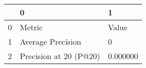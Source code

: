 \begin{tabular}{lll}
\toprule
 & 0 & 1 \\
\midrule
0 & Metric & Value \\
1 & Average Precision & 0 \\
2 & Precision at 20 (P@20) & 0.000000 \\
\bottomrule
\end{tabular}

